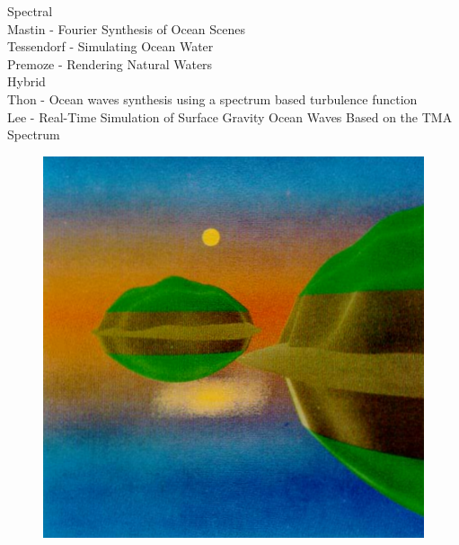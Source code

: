 Spectral\\
Mastin - Fourier Synthesis of Ocean Scenes \cite{Mastin:1987}\\
Tessendorf - Simulating Ocean Water \cite{course:simulatingocean}\\
Premoze - Rendering Natural Waters \cite{Premoze:2000} \\

Hybrid\\
Thon - Ocean waves synthesis using a spectrum based turbulence function \cite{thon:2000}\\
Lee - Real-Time Simulation of Surface Gravity Ocean Waves Based on the TMA Spectrum\cite{lee:2007}\\

\begin{figure}
\centering
 \subtop
 {
  \includegraphics[scale=0.25]{figures/Vectorized_Procedural_Models_for_Natural_Terrain_-_Max_1981-006_1.png}
 }
 \hfill
 \subtop
 {
}
\end{figure}
